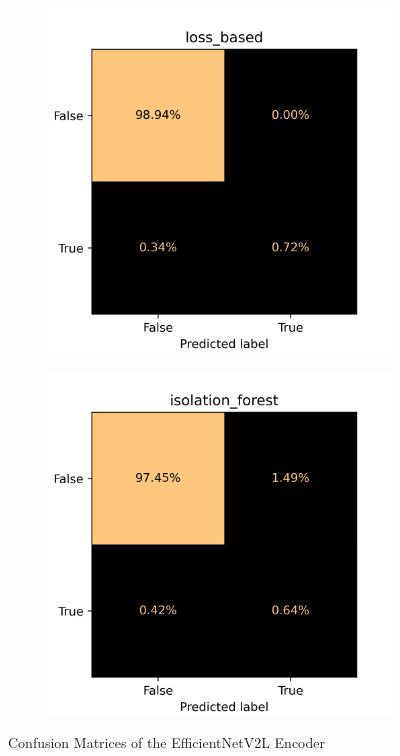 \begin{figure}[!ht]
    \centering
    \begin{subfigure}{0.4\textwidth}
        \centering
        \includegraphics[width=\textwidth,trim={0 1cm 0 1cm},clip]{./results/efficientnetv2l_vgg19/20230525_194238_loss_based_cm.png}
    \end{subfigure}
    \begin{subfigure}{0.4\textwidth}
        \centering
        \includegraphics[width=\textwidth,trim={0 1cm 0 1cm},clip]{./results/efficientnetv2l_vgg19/20230525_194238_isolation_forest_cm.png}
    \end{subfigure}
    \caption{Confusion Matrices of the EfficientNetV2L Encoder}
    \label{fig:efficientnetv2l_cm}
\end{figure}